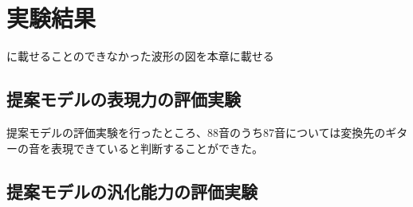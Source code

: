 \chapter{実験結果}
\label{app:result}

に載せることのできなかった波形の図を本章に載せる

\section{提案モデルの表現力の評価実験}

提案モデルの評価実験を行ったところ、88音のうち87音については変換先のギターの音を表現できていると判断することができた。


\section{提案モデルの汎化能力の評価実験}
